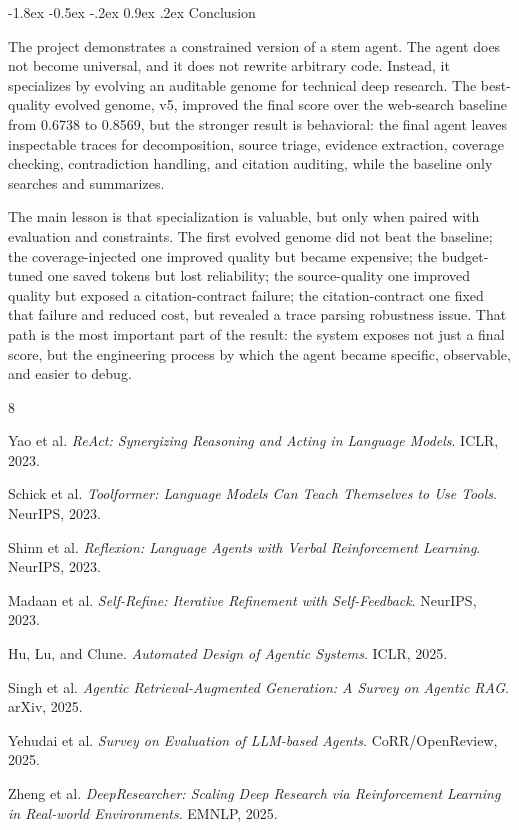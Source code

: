 \documentclass[10pt]{article}
\makeatletter
\renewcommand\section{\@startsection{section}{1}{\z@}%
  {-1.8ex \@plus -0.5ex \@minus -.2ex}%
  {0.9ex \@plus .2ex}%
  {\normalfont\large\bfseries}}
\makeatother
\begin{document}
\section{Conclusion}

The project demonstrates a constrained version of a stem agent. The agent does not become universal, and it does not rewrite arbitrary code. Instead, it specializes by evolving an auditable genome for technical deep research. The best-quality evolved genome, v5, improved the final score over the web-search baseline from 0.6738 to 0.8569, but the stronger result is behavioral: the final agent leaves inspectable traces for decomposition, source triage, evidence extraction, coverage checking, contradiction handling, and citation auditing, while the baseline only searches and summarizes.

The main lesson is that specialization is valuable, but only when paired with evaluation and constraints. The first evolved genome did not beat the baseline; the coverage-injected one improved quality but became expensive; the budget-tuned one saved tokens but lost reliability; the source-quality one improved quality but exposed a citation-contract failure; the citation-contract one fixed that failure and reduced cost, but revealed a trace parsing robustness issue. That path is the most important part of the result: the system exposes not just a final score, but the engineering process by which the agent became specific, observable, and easier to debug.

\begin{thebibliography}{8}
\small

Yao et al. \emph{ReAct: Synergizing Reasoning and Acting in Language Models}. ICLR, 2023.

Schick et al. \emph{Toolformer: Language Models Can Teach Themselves to Use Tools}. NeurIPS, 2023.

Shinn et al. \emph{Reflexion: Language Agents with Verbal Reinforcement Learning}. NeurIPS, 2023.

Madaan et al. \emph{Self-Refine: Iterative Refinement with Self-Feedback}. NeurIPS, 2023.

Hu, Lu, and Clune. \emph{Automated Design of Agentic Systems}. ICLR, 2025.

Singh et al. \emph{Agentic Retrieval-Augmented Generation: A Survey on Agentic RAG}. arXiv, 2025.

Yehudai et al. \emph{Survey on Evaluation of LLM-based Agents}. CoRR/OpenReview, 2025.

Zheng et al. \emph{DeepResearcher: Scaling Deep Research via Reinforcement Learning in Real-world Environments}. EMNLP, 2025.

\end{thebibliography}
\end{document}
